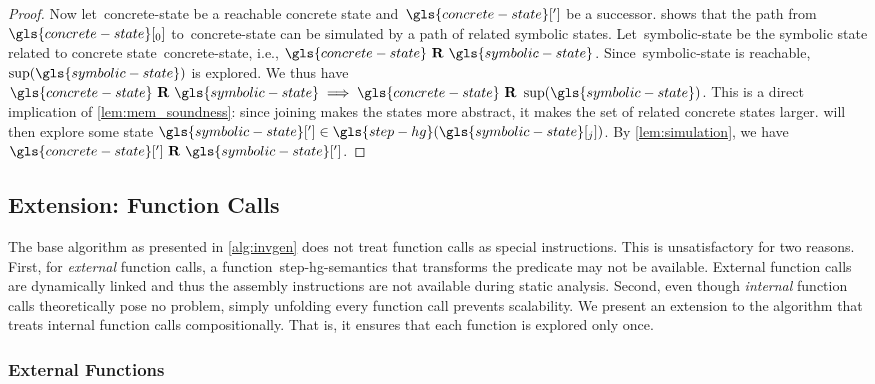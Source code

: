 \begin{proof}
  Now let~\gls{concrete-state} be a reachable concrete state and~$\gls{concrete-state}[']$ be a successor.
   shows that the path from~$\gls{concrete-state}[_0]$ to~\gls{concrete-state} can be simulated by a path of related symbolic states.
  Let~\gls{symbolic-state} be the symbolic state related to concrete state~\gls{concrete-state}, i.e., $\gls{concrete-state}~\mathbf{R}~\gls{symbolic-state}$.
  Since~\gls{symbolic-state} is reachable, $\suprem(\gls{symbolic-state})$ is explored.
  We thus have
  $\gls{concrete-state}~\mathbf{R}~\gls{symbolic-state} \implies \gls{concrete-state}~\mathbf{R}~\suprem(\gls{symbolic-state})$.
  This is a direct implication of \cref{lem:mem_soundness}: since joining makes the states more abstract, it makes the set of related concrete states larger.
   will then explore some state $\gls{symbolic-state}['] \in \gls{step-hg}(\gls{symbolic-state}[_j])$.
  By \cref{lem:simulation}, we have $\gls{concrete-state}[']~\mathbf{R}~\gls{symbolic-state}[']$.
\end{proof}

\subsection{Extension: Function Calls}\label{function-call-extension}
The base algorithm as presented in \cref{alg:invgen} does not treat function calls as special instructions.
This is unsatisfactory for two reasons.
First, for \emph{external} function calls, a function~\gls{step-hg-semantics} that transforms the predicate may not be available.
External function calls are dynamically linked and thus the assembly instructions are not available during static analysis.
Second, even though \emph{internal} function calls theoretically pose no problem, simply unfolding every function call prevents scalability.
We present an extension to the algorithm that treats internal function calls compositionally. That is, it ensures that each function is explored only once.

\subsubsection{External Functions}

